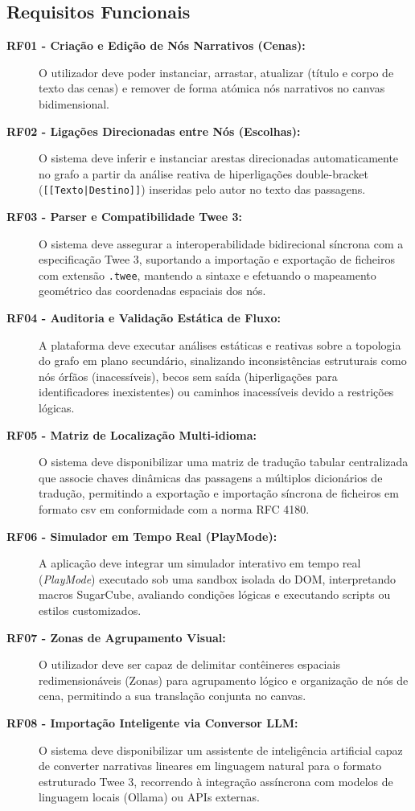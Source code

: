 \subsection{Requisitos Funcionais}
\begin{description}
    \item[\textbf{RF01 - Criação e Edição de Nós Narrativos (Cenas):}] O utilizador deve poder instanciar, arrastar, atualizar (título e corpo de texto das cenas) e remover de forma atómica nós narrativos no canvas bidimensional.
    \item[\textbf{RF02 - Ligações Direcionadas entre Nós (Escolhas):}] O sistema deve inferir e instanciar arestas direcionadas automaticamente no grafo a partir da análise reativa de hiperligações double-bracket (\texttt{[[Texto|Destino]]}) inseridas pelo autor no texto das passagens.
    \item[\textbf{RF03 - Parser e Compatibilidade Twee 3:}] O sistema deve assegurar a interoperabilidade bidirecional síncrona com a especificação Twee 3, suportando a importação e exportação de ficheiros com extensão \texttt{.twee}, mantendo a sintaxe e efetuando o mapeamento geométrico das coordenadas espaciais dos nós.
    \item[\textbf{RF04 - Auditoria e Validação Estática de Fluxo:}] A plataforma deve executar análises estáticas e reativas sobre a topologia do grafo em plano secundário, sinalizando inconsistências estruturais como nós órfãos (inacessíveis), becos sem saída (hiperligações para identificadores inexistentes) ou caminhos inacessíveis devido a restrições lógicas.
    \item[\textbf{RF05 - Matriz de Localização Multi-idioma:}] O sistema deve disponibilizar uma matriz de tradução tabular centralizada que associe chaves dinâmicas das passagens a múltiplos dicionários de tradução, permitindo a exportação e importação síncrona de ficheiros em formato \gls{csv} em conformidade com a norma RFC 4180.
    \item[\textbf{RF06 - Simulador em Tempo Real (PlayMode):}] A aplicação deve integrar um simulador interativo em tempo real (\textit{PlayMode}) executado sob uma sandbox isolada do DOM, interpretando macros SugarCube, avaliando condições lógicas e executando scripts ou estilos customizados.
    \item[\textbf{RF07 - Zonas de Agrupamento Visual:}] O utilizador deve ser capaz de delimitar contêineres espaciais redimensionáveis (Zonas) para agrupamento lógico e organização de nós de cena, permitindo a sua translação conjunta no canvas.
    \item[\textbf{RF08 - Importação Inteligente via Conversor LLM:}] O sistema deve disponibilizar um assistente de inteligência artificial capaz de converter narrativas lineares em linguagem natural para o formato estruturado Twee 3, recorrendo à integração assíncrona com modelos de linguagem locais (Ollama) ou APIs externas.
\end{description}

